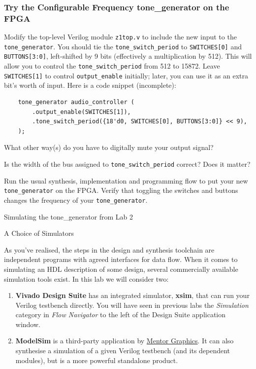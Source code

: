 \documentclass[11pt]{article}
\makeatletter
\renewcommand{\section}
{\@startsection {section}{1}{0pt}
 {-2ex}
 {1ex}
 {\bfseries\Large}}
\renewcommand{\subsection}
{\@startsection {subsection}{1}{0pt}
 {-1ex}
 {0.5ex}
 {\bfseries\normalsize}}
\makeatother
\begin{document}
\subsubsection{Try the Configurable Frequency tone\_generator on the FPGA}
Modify the top-level Verilog module \verb|z1top.v| to include the new input to the \verb|tone_generator|. You should tie the \verb|tone_switch_period| to \verb|SWITCHES[0]| and \verb|BUTTONS[3:0]|, left-shifted by 9 bits (effectively a multiplication by 512). This will allow you to control the \verb|tone_switch_period| from 512 to 15872. Leave \verb|SWITCHES[1]| to control \verb|output_enable| initially; later, you can use it as an extra bit's worth of input. Here is a code snippet (incomplete):

\begin{verbatim}
    tone_generator audio_controller (
        .output_enable(SWITCHES[1]),
        .tone_switch_period({18'd0, SWITCHES[0], BUTTONS[3:0]} << 9),
    );
\end{verbatim}

What other way(s) do you have to digitally mute your output signal?

Is the width of the bus assigned to \verb|tone_switch_period| correct? Does it matter?

Run the usual synthesis, implementation and programming flow to put your new \verb|tone_generator| on the FPGA. Verify that toggling the switches and buttons changes the frequency of your \verb|tone_generator|.

\section{Simulating the tone\_generator from Lab 2}

\subsection{A Choice of Simulators}

As you've realised, the steps in the design and synthesis toolchain are independent programs with agreed interfaces for data flow. When it comes to simulating an HDL description of some design, several commercially available simulation tools exist. In this lab we will consider two:

\begin{enumerate}
  \item \textbf{Vivado Design Suite} has an integrated simulator, \textbf{xsim}, that can run your Verilog testbench directly. You will have seen in previous labs the \emph{Simulation} category in \emph{Flow Navigator} to the left of the Design Suite application window.
  \item \textbf{ModelSim} is a third-party application by \href{https://www.mentor.com/products/fv/modelsim/}{Mentor Graphics}. It can also synthesise a simulation of a given Verilog testbench (and its dependent modules), but is a more powerful standalone product.
\end{enumerate}
\end{document}
